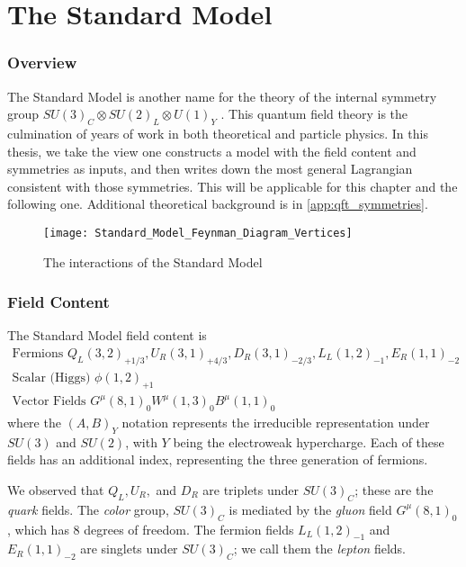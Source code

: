 \chapter{The Standard Model}

\subsection{Overview}


The Standard Model is another name for the theory of the internal symmetry group $SU(3)_C \otimes SU(2)_L \otimes U(1)_Y$ .
This quantum field theory is the culmination of years of work in both theoretical and particle physics.  
In this thesis, we take the view one constructs a model with the field content and symmetries as inputs, and then writes down the most general Lagrangian consistent with those symmetries.
This will be applicable for this chapter and the following one.
Additional theoretical background is in \ref{app:qft_symmetries}.

\begin{figure}
\caption{The interactions of the Standard Model}
\texttt{[image: Standard\_Model\_Feynman\_Diagram\_Vertices]}
\end{figure}

\subsection{Field Content}

The Standard Model field content is
\begin{equation}
\begin{aligned}
\text{Fermions } Q_L(3,2)_{+1/3}, \xspace  U_R(3,1)_{+4/3},\xspace  D_R(3,1)_{-2/3} ,\xspace  L_L(1,2)_{-1} ,\xspace  E_R(1,1)_{-2}\\
\text{Scalar (Higgs) } \xspace \phi(1,2)_{+1} \\
\text{Vector Fields } \xspace G^\mu(8,1)_0 \xspace W^\mu(1,3)_0  \xspace B^\mu(1,1)_0
\end{aligned}
\end{equation}
where the $(A, B)_Y$ notation represents the irreducible representation under $SU(3)$ and $SU(2)$, with $Y$ being the electroweak hypercharge.
Each of these fields has an additional index, representing the three generation of fermions.

We observed that $Q_L, U_R,$ and $D_R$ are triplets under $SU(3)_C$; these are the \textit{quark} fields.
The \textit{color} group, $SU(3)_C$ is mediated by the \textit{gluon} field $G^\mu(8,1)_0$, which has 8 degrees of freedom.
The fermion fields $L_L(1,2)_{-1}$ and $  E_R(1,1)_{-2} $ are singlets under $SU(3)_C$; we call them the \textit{lepton} fields.

